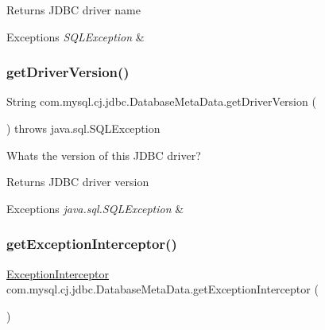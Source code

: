 \begin{DoxyReturn}{Returns}
J\+D\+BC driver name 
\end{DoxyReturn}

\begin{DoxyExceptions}{Exceptions}
{\em S\+Q\+L\+Exception} & \\
\hline
\end{DoxyExceptions}
\mbox{\label{classcom_1_1mysql_1_1cj_1_1jdbc_1_1_database_meta_data_ae8ee990a19bf7059831d95561dfdc558}} 
\subsubsection{\texorpdfstring{get\+Driver\+Version()}{getDriverVersion()}}
{\footnotesize\ttfamily String com.\+mysql.\+cj.\+jdbc.\+Database\+Meta\+Data.\+get\+Driver\+Version (\begin{DoxyParamCaption}{ }\end{DoxyParamCaption}) throws java.\+sql.\+S\+Q\+L\+Exception}

What\textquotesingle{}s the version of this J\+D\+BC driver?

\begin{DoxyReturn}{Returns}
J\+D\+BC driver version 
\end{DoxyReturn}

\begin{DoxyExceptions}{Exceptions}
{\em java.\+sql.\+S\+Q\+L\+Exception} & \\
\hline
\end{DoxyExceptions}
\mbox{\label{classcom_1_1mysql_1_1cj_1_1jdbc_1_1_database_meta_data_a099b29ac36f3fc4040a843f2e1ca5b46}} 
\subsubsection{\texorpdfstring{get\+Exception\+Interceptor()}{getExceptionInterceptor()}}
{\footnotesize\ttfamily \mbox{\hyperlink{interfacecom_1_1mysql_1_1cj_1_1exceptions_1_1_exception_interceptor}{Exception\+Interceptor}} com.\+mysql.\+cj.\+jdbc.\+Database\+Meta\+Data.\+get\+Exception\+Interceptor (\begin{DoxyParamCaption}{ }\end{DoxyParamCaption})\hspace{0.3cm}{\ttfamily [protected]}}


